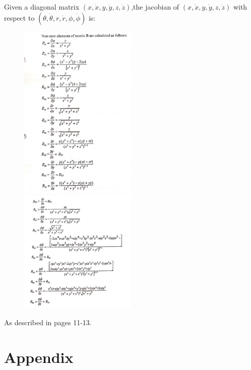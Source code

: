 \documentclass{article}
\newcommand{\rrate}{\dot{r}}
\newcommand{\brate}{\dot{\theta}}
\newcommand{\erate}{\dot{\phi}}
\begin{document}
Given a diagonal matrix $(x,\dot{x},y,\dot{y},z,\dot{z})$,the jacobian of
$(x,\dot{x},y,\dot{y},z,\dot{z})$ with respect to $(\theta,\brate, r, \rrate, \phi, \erate)$ is:


\begin{figure}[H]\label{fig:spherical}
\includegraphics[width=0.5\textwidth,height=0.5\textheight,keepaspectratio]{figures/spherical-covariance1}
\includegraphics[width=0.5\textwidth,height=0.5\textheight,keepaspectratio]{figures/spherical-covariance2}
\end{figure}

As described in pages 11-13.





\section{Appendix}

\end{document}
